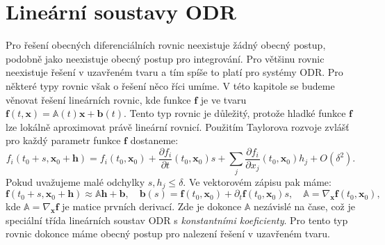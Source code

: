 \documentclass[a4paper, 12pt]{book}
\theoremstyle{definition}
\def\grad{\nabla}
\def\vc#1{\mathbf{\boldsymbol{#1}}}     %
\def\tn#1{{\mathbb{#1}}}    %
\def\prtl{\partial}                                        %
\def\df#1{\emph{#1}}
\begin{document}
\section{Lineární soustavy ODR}
\label{linearni_soustavy}


Pro řešení obecných diferenciálních rovnic neexistuje žádný obecný postup, podobně jako neexistuje obecný postup pro integrování. Pro většinu rovnic neexistuje
řešení v uzavřeném tvaru a tím spíše to platí pro systémy ODR. Pro některé typy rovnic však o řešení něco říci umíme. V této kapitole se budeme věnovat řešení lineárních rovnic, kde
funkce $\vc f$ je ve tvaru $\vc f(t,\vc x) = \tn A(t) \vc x + \vc b(t)$. Tento typ rovnic je důležitý, protože hladké funkce $\vc f$ lze lokálně aproximovat právě lineární rovnicí.
Použitím Taylorova rozvoje zvlášť pro každý parametr funkce $\vc f$ dostaneme:
\[
   f_i(t_0 + s, \vc x_0 + \vc h) = f_i(t_0, \vc x_0) + \frac{\prtl f_i}{\prtl t}(t_0,\vc x_0)s + \sum_j \frac{\prtl f_i}{\prtl x_j}(t_0,\vc x_0) h_j + O(\delta^2).
\]
Pokud uvažujeme malé odchylky $s, h_j \le \delta$. Ve vektorovém zápisu pak máme:
\[
  \vc f(t_0 + s, \vc x_0 + \vc h) \approx \tn A \vc h + \vc b,\quad \vc b(s)=\vc f(t_0, \vc x_0) + \prtl_{t} \vc f(t_0, \vc x_0) s,\quad \tn A = \grad_{\vc x} \vc f(t_0, \vc x_0),
\]
kde $\tn A =\grad_{\vc x} \vc f$ je matice prvních derivací. Zde je dokonce $\tn A$ nezávislé na čase, což je speciální třída lineárních soustav ODR s \df{konstantními koeficienty}.
Pro tento typ rovnic dokonce máme obecný postup pro nalezení řešení v uzavřeném tvaru.
\end{document}
